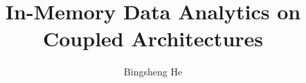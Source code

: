 \documentclass[10pt]{article}
\begin{document}
\title{In-Memory Data Analytics on Coupled Architectures}
\date{}
\author{Bingsheng He}
\maketitle











\end{document}
